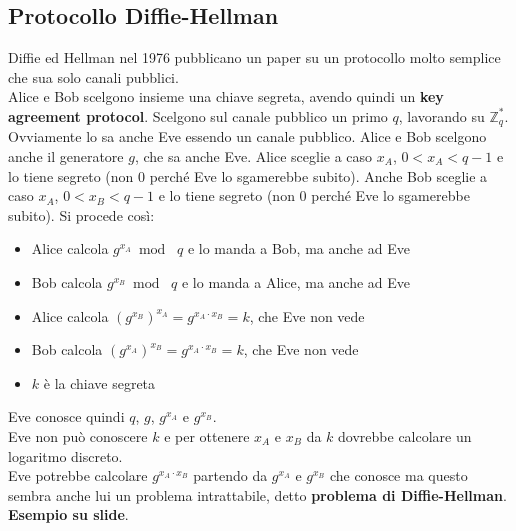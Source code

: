 \documentclass[a4paper,12pt, oneside]{book}
\begin{document}
\subsection{Protocollo Diffie-Hellman}
Diffie ed Hellman nel 1976 pubblicano un paper su un protocollo molto semplice
che sua solo canali pubblici.\\
Alice e Bob scelgono insieme una chiave segreta, avendo quindi un \textbf{key
  agreement protocol}. Scelgono sul canale pubblico un primo $q$, lavorando su
$\mathbb{Z}_q^*$. Ovviamente lo sa anche Eve essendo un canale pubblico. Alice e
Bob scelgono anche il generatore $g$, che sa anche Eve. Alice sceglie a caso
$x_A$, $0<x_A<q-1$ e lo tiene segreto (non 0 perché Eve lo sgamerebbe
subito). Anche Bob sceglie a caso $x_A$, $0<x_B<q-1$ e lo tiene segreto (non 0
perché Eve lo sgamerebbe subito). Si procede così:
\begin{itemize}
  \item Alice calcola $g^{x_A}\bmod\,\,q$ e lo manda a Bob, ma anche ad Eve
  \item Bob calcola $g^{x_B}\bmod\,\,q$ e lo manda a Alice, ma anche ad Eve
  \item Alice calcola $(g^{x_B})^{x_A}=g^{x_A\cdot x_B}=k$, che Eve non vede
  \item Bob calcola $(g^{x_A})^{x_B}=g^{x_A\cdot x_B}=k$, che Eve non vede
  \item $k$ è la chiave segreta
\end{itemize}
Eve conosce quindi $q$, $g$, $g^{x_A}$ e $g^{x_B}$.\\
Eve non può conoscere $k$ e per ottenere $x_A$ e $x_B$ da $k$ dovrebbe calcolare
un logaritmo discreto.\\
Eve potrebbe calcolare $g^{x_A\cdot x_B}$ partendo da $g^{x_A}$ e $g^{x_B}$ che
conosce ma questo sembra anche lui un problema intrattabile, detto
\textbf{problema di Diffie-Hellman}.\\
\textbf{Esempio su slide}.
\end{document}
